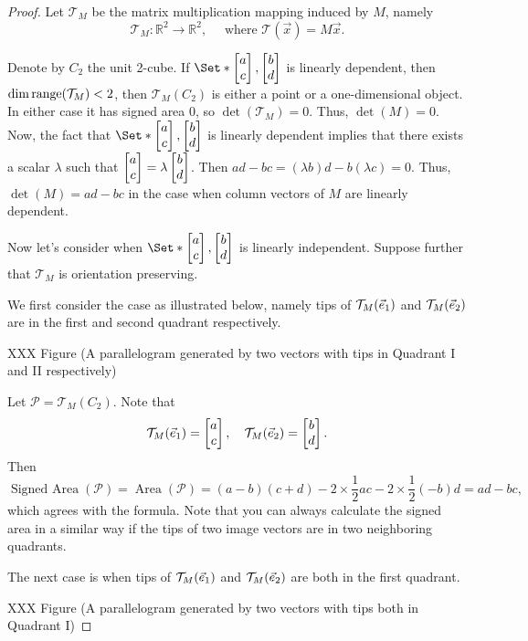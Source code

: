 \begin{proof}
	Let $\mathcal{T}_{M}$ be the matrix multiplication mapping induced by $M$,
	namely
	\[
		\mathcal{T}_{M}:\mathbb{R}^{2}\rightarrow\mathbb{R}^{2},\quad\text{ where }\mathcal{T}(\vec x)=M\vec x.
	\]

	Denote by $C_{2}$ the unit 2-cube. If $\Set*{\matc{a \\ c},\matc{b \\ d}}$
	is linearly dependent, then $\dim \operatorname{range}(\mathcal{T}_{M})<2$, then
	$\mathcal{T}_{{M}}(C_{2})$ is either a point or a one-dimensional object. In
	either case it has signed area $0$, so $\det(\mathcal{T}_{M})=0$. Thus,
	$\det(M)=0$. Now, the fact that $\Set*{\matc{a \\ c},\matc{b \\ d}}$ is
	linearly dependent implies that there exists a scalar $\lambda$ such that
	$\begin{bmatrix}a \\ c\end{bmatrix}=\lambda\begin{bmatrix}b \\ d\end{bmatrix}$. Then $ad-bc=(\lambda b)d-b(\lambda c)=0$.
	Thus, $\det(M)=ad-bc$ in the case when column vectors of $M$ are linearly dependent.

	Now let's consider when $\Set*{\matc{a \\ c},\matc{b \\ d}}$ is linearly independent.
	Suppose further that $\mathcal{T}_{M}$ is orientation preserving.

	We first consider the case as illustrated below, namely tips of $\mathcal{T}_{M}
	({\vec e_1})$ and $\mathcal{T}_{M}({\vec e_2})$ are in the first and second quadrant respectively.

	XXX Figure (A parallelogram generated by two vectors with tips in Quadrant I
	and II respectively)

	Let $\mathcal{P}=\mathcal{T}_{M}(C_{2})$. Note that
	\[
		\mathcal{T}_{M}({\vec e_1})= \begin{bmatrix}a \\ c\end{bmatrix},\quad \mathcal{T}_{M}({\vec e_2})=\begin{bmatrix}b \\ d\end{bmatrix}.
	\]
	Then
	\[
		\operatorname{Signed~Area}(\mathcal{P})=\operatorname{Area}(\mathcal{P})=(a-b)(c+d)-2\times \frac{1}{2}ac-2\times \frac{1}{2}(-b)d=ad-bc,
	\]
	which agrees with the formula. Note that you can always calculate the signed
	area in a similar way if the tips of two image vectors are in two
	neighboring quadrants.

	The next case is when tips of $\mathcal{T}_{M}({\vec e_1})$ and
	$\mathcal{T}_{M}({\vec e_2} )$ are both in the first quadrant.

	XXX Figure (A parallelogram generated by two vectors with tips both in Quadrant
	I)


\end{proof}
